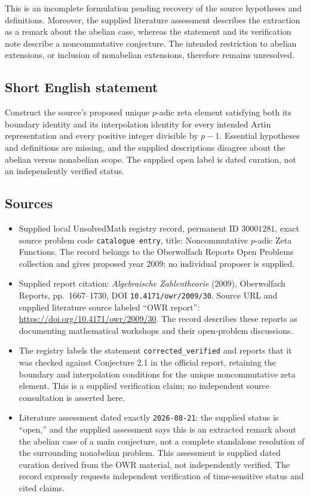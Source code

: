 \documentclass[11pt]{article}
\begin{document}
This is an incomplete formulation pending recovery of the source hypotheses and definitions. Moreover, the supplied literature assessment describes the extraction as a remark about the abelian case, whereas the statement and its verification note describe a noncommutative conjecture. The intended restriction to abelian extensions, or inclusion of nonabelian extensions, therefore remains unresolved.
\subsection{Short English statement}
Construct the source's proposed unique \(p\)-adic zeta element satisfying both its boundary identity and its interpolation identity for every intended Artin representation and every positive integer divisible by \(p-1\). Essential hypotheses and definitions are missing, and the supplied descriptions disagree about the abelian versus nonabelian scope. The supplied open label is dated curation, not an independently verified status.
\subsection{Sources}
\begin{itemize}
\item Supplied local UnsolvedMath registry record, permanent ID \(30001281\), exact source problem code \texttt{catalogue entry}, title: Noncommutative \(p\)-adic Zeta Functions. The record belongs to the Oberwolfach Reports Open Problems collection and gives proposed year \(2009\); no individual proposer is supplied.
\item Supplied report citation: \emph{Algebraische Zahlentheorie} (2009), Oberwolfach Reports, pp.\ 1667--1730, DOI \texttt{10.4171/owr/2009/30}. Source URL and supplied literature source labeled ``OWR report'': \url{https://doi.org/10.4171/owr/2009/30}. The record describes these reports as documenting mathematical workshops and their open-problem discussions.
\item The registry labels the statement \texttt{corrected\_verified} and reports that it was checked against Conjecture 2.1 in the official report, retaining the boundary and interpolation conditions for the unique noncommutative zeta element. This is a supplied verification claim; no independent source consultation is asserted here.
\item Literature assessment dated exactly \texttt{2026-08-21}: the supplied status is ``open,'' and the supplied assessment says this is an extracted remark about the abelian case of a main conjecture, not a complete standalone resolution of the surrounding nonabelian problem. This assessment is supplied dated curation derived from the OWR material, not independently verified. The record expressly requests independent verification of time-sensitive status and cited claims.
\end{itemize}
\end{document}
